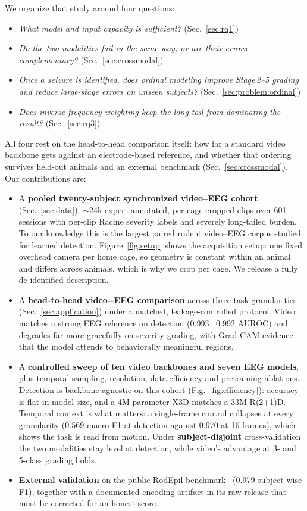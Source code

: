 We organize that study around four questions:
\begin{itemize}[leftmargin=2.6em,itemsep=1pt,topsep=2pt]
  \item[\textbf{RQ1}] \emph{What model and input capacity is sufficient?}
  (Sec.~\ref{sec:rq1})
  \item[\textbf{RQ2}] \emph{Do the two modalities fail in the same way, or are
  their errors complementary?} (Sec.~\ref{sec:crossmodal})
  \item[\textbf{RQ3}] \emph{Once a seizure is identified, does ordinal modeling
  improve Stage\,2--5 grading and reduce large-stage errors on unseen subjects?}
  (Sec.~\ref{sec:problem:ordinal})
  \item[\textbf{RQ4}] \emph{Does inverse-frequency weighting keep the long tail
  from dominating the result?} (Sec.~\ref{sec:rq3})
\end{itemize}
All four rest on the head-to-head comparison itself: how far a standard
video backbone gets against an electrode-based reference, and whether that ordering
survives held-out animals and an external benchmark
(Sec.~\ref{sec:crossmodal}). Our contributions are:

\begin{itemize}
  \itemsep0.15em
  \item A \textbf{pooled twenty-subject synchronized video--EEG cohort}
  (Sec.~\ref{sec:data}): $\sim$24k expert-annotated, per-cage-cropped clips over
  601 sessions with per-clip Racine severity labels and severely long-tailed
  burden. To our knowledge this is the largest paired rodent video--EEG corpus
  studied for learned detection. Figure~\ref{fig:setup} shows the acquisition setup: one
  fixed overhead camera per home cage, so geometry is constant within an animal and
  differs across animals, which is why we crop per cage. We release a fully
  de-identified description.
  \item A \textbf{head-to-head video-\vs-EEG comparison} across three task
  granularities (Sec.~\ref{sec:application}) under a matched, leakage-controlled
  protocol. Video matches a strong EEG reference on detection (0.993 \vs\ 0.992
  AUROC) and degrades far more gracefully on severity grading, with Grad-CAM
  evidence that the model attends to behaviorally meaningful regions.
  \item A \textbf{controlled sweep of ten video backbones and seven EEG models},
  plus temporal-sampling, resolution, data-efficiency and pretraining ablations.
  Detection is backbone-agnostic on this cohort (Fig.~\ref{fig:efficiency}):
  accuracy is flat in model size, and a 4M-parameter X3D matches a 33M R(2+1)D.
  Temporal context is what matters: a single-frame control collapses at
  every granularity (0.569 macro-F1 at detection against 0.970 at 16 frames),
  which shows the task is read from motion. Under \textbf{subject-disjoint}
  cross-validation the two modalities stay level at detection, while video's
  advantage at 3- and 5-class grading holds.
  \item \textbf{External validation} on the public RodEpil
  benchmark~\cite{rodepil2025} (0.979 subject-wise F1), together with a
  documented encoding artifact in its raw release that must be corrected for an
  honest score.
\end{itemize}
